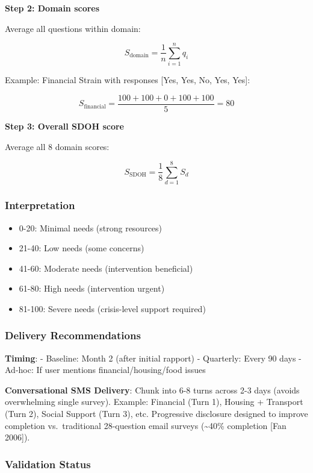 \documentclass[
]{article}
\providecommand{\tightlist}{%
  \setlength{\itemsep}{0pt}\setlength{\parskip}{0pt}}
\begin{document}
\textbf{Step 2: Domain scores}

Average all questions within domain:

\[S_{\text{domain}} = \frac{1}{n} \sum_{i=1}^{n} q_i\]

Example: Financial Strain with responses {[}Yes, Yes, No, Yes, Yes{]}:

\[S_{\text{financial}} = \frac{100 + 100 + 0 + 100 + 100}{5} = 80\]

\textbf{Step 3: Overall SDOH score}

Average all 8 domain scores:

\[S_{\text{SDOH}} = \frac{1}{8} \sum_{d=1}^{8} S_{d}\]

\subsubsection{Interpretation}\label{interpretation}

\begin{itemize}
\tightlist
\item
  0-20: Minimal needs (strong resources)
\item
  21-40: Low needs (some concerns)
\item
  41-60: Moderate needs (intervention beneficial)
\item
  61-80: High needs (intervention urgent)
\item
  81-100: Severe needs (crisis-level support required)
\end{itemize}

\subsubsection{Delivery Recommendations}\label{delivery-recommendations}

\textbf{Timing}: - Baseline: Month 2 (after initial rapport) -
Quarterly: Every 90 days - Ad-hoc: If user mentions
financial/housing/food issues

\textbf{Conversational SMS Delivery}: Chunk into 6-8 turns across 2-3
days (avoids overwhelming single survey). Example: Financial (Turn 1),
Housing + Transport (Turn 2), Social Support (Turn 3), etc. Progressive
disclosure designed to improve completion vs.~traditional 28-question
email surveys (\textasciitilde40\% completion {[}Fan 2006{]}).

\subsubsection{Validation Status}\label{validation-status}
\end{document}
